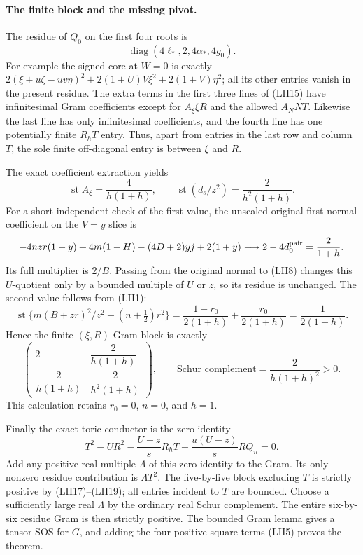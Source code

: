 \paragraph{The finite block and the missing pivot.}
The residue of $Q_0$ on the first four roots is
\[
             \operatorname{diag}(4\ell_*,2,4\alpha_*,4g_0).
                                                        \tag{LII17}
\]
For example the signed core at $W=0$ is exactly
$2(\xi+u\zeta-uv\eta)^2+2(1+U)V\xi^2+2(1+V)\eta^2$;
all its other entries vanish in the present residue.  The extra
terms in the first three lines of (LII15) have infinitesimal Gram
coefficients except for $A_\xi\xi R$ and the allowed $A_NNT$.
Likewise the last line has only infinitesimal coefficients, and
the fourth line has one potentially finite $R_hT$ entry.  Thus,
apart from entries in the last row and column $T$, the sole finite
off-diagonal entry is between $\xi$ and $R$.

The exact coefficient extraction yields
\[
 \operatorname{st}A_\xi=\frac4{h(1+h)},\qquad
 \operatorname{st}(d_s/z^2)=\frac2{h^2(1+h)}.     \tag{LII18}
\]
For a short independent check of the first value, the unscaled
original first-normal coefficient on the $V=y$ slice is
\[
 -4nzr(1+y)+4m(1-H)-(4D+2)yj+2(1+y)
 \longrightarrow 2-4d_0^{\rm pair}=\frac2{1+h}.
\]
Its full multiplier is $2/B$.  Passing from the original normal
to (LII8) changes this $U$-quotient only by a bounded multiple of
$U$ or $z$, so its residue is unchanged.  The second value follows
from (LII1):
\[
 \operatorname{st}\{m(B+zr)^2/z^2+(n+\tfrac12)r^2\}
 =\frac{1-r_0}{2(1+h)}+\frac{r_0}{2(1+h)}
 =\frac1{2(1+h)}.
\]
Hence the finite $(\xi,R)$ Gram block is exactly
\[
 \begin{pmatrix}
  2&\dfrac2{h(1+h)}\\[2mm]
  \dfrac2{h(1+h)}&\dfrac2{h^2(1+h)}
 \end{pmatrix},\qquad
 \text{Schur complement}=\frac2{h(1+h)^2}>0.      \tag{LII19}
\]
This calculation retains $r_0=0$, $n=0$, and $h=1$.

Finally the exact toric conductor is the zero identity
\[
 \boxed{\quad
 T^2-UR^2-\frac{U-z}{s}R_hT
             +\frac{u(U-z)}s RQ_n=0.\quad}       \tag{LII20}
\]
Add any positive real multiple $\Lambda$ of this zero identity to
the Gram.  Its only nonzero residue contribution is $\Lambda T^2$.
The five-by-five block excluding $T$ is strictly positive by
(LII17)--(LII19); all entries incident to $T$ are bounded.  Choose
a sufficiently large real $\Lambda$ by the ordinary real Schur
complement.  The entire six-by-six residue Gram is then strictly
positive.  The bounded Gram lemma gives a tensor SOS for $G$, and
adding the four positive square terms (LII5) proves the theorem.

